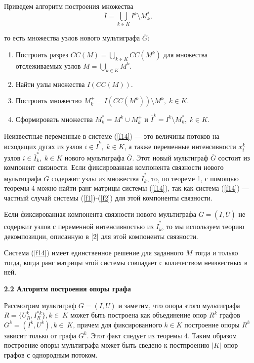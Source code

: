 \documentclass[14pt]{extarticle}%
\begin{document}
Приведем алгоритм построения множества $$\overline I=\bigcup_{k\in K}I^k\setminus M^*_k,$$

то есть множества узлов нового мультиграфа $\overline G$:
\begin{enumerate}
    \item Построить разрез $CC(M)=\bigcup_{k\in K}CC(M^k)$ для множества отслеживаемых узлов $M=\bigcup_{k\in K}M^k$.
    \item Найти узлы множества $I(CC(M))$.
    \item Построить множество $M^+_k=I(CC(M^k))\setminus M^k,\; k\in K$.
    \item Сформировать множества $M^*_k=M^k\cup M^+_k$ и $\overline I^k=I^k\setminus M^*_k,\;k\in K$.
\end{enumerate}

Неизвестные переменные в системе (\ref{f14}) --- это величины потоков на исходящих дугах из узлов $i\in \overline I^k,\;k\in K$, а также переменные интенсивности $x^k_i$ узлов $i\in\overline I^*_k, \;k\in K$ нового мультиграфа $\overline G$. Этот новый мультиграф $\overline G$ состоит из компонент связности. Если фиксированная компонента связности нового мультиграфа $\overline G$ содержит узлы из множества $\overline I^*_k$, то, по теореме 1, с помощью теоремы 4 можно найти ранг матрицы системы (\ref{f14}), так как система (\ref{f14}) --- частный случай системы (\ref{f1})-(\ref{f2}) для этой компоненты связности.

Если фиксированная компонента связности нового мультиграфа $\overline G=(\overline I, \overline U)$ не содержит узлов с переменной интенсивностью из $\overline I^*_k$, то мы используем теорию декомпозиции, описанную в [2] для этой компоненты связности.

Система (\ref{f14}) имеет единственное решение для заданного $M$ тогда и только тогда, когда ранг матрицы этой системы совпадает с количеством неизвестных в ней.

\textbf{2.2 Алгоритм построения опоры графа}

Рассмотрим мультиграф $G=(I,U)$ и заметим, что опора этого мультиграфа $R=\{U^k_R, I^{*k}_R\}, k\in~K$  может быть построена как объединение опор $R^k$ графов $G^k=(I^k, U^k), k\in~K$, причем для фиксированного $k\in K$ построение опоры $R^k$ зависит только от графа $G^k$. Этот факт следует из теоремы 4. Таким образом построение опоры мультиграфа может быть сведено к постпроению $|K|$ опор графов с однородным потоком. 
\end{document}
